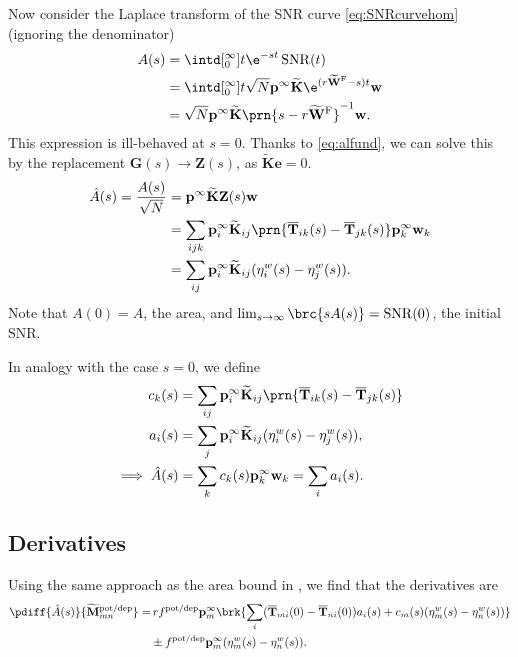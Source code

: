 \documentclass[12pt]{article}
\newcommand{\inv}{^{-1}}
\newcommand{\onev}{\mathbf{e}}
\newcommand{\pr}{\mathbf{p}}
\newcommand{\eq}{\pr^\infty}
\newcommand{\fpt}{\mathbf{T}}
\newcommand{\fptb}{\overline{\fpt}}
\newcommand{\fund}{\mathbf{Z}}
\newcommand{\w}{\mathbf{w}}
\newcommand{\W}{\mathbf{W}}
\newcommand{\M}{\mathbf{M}}
\newcommand{\enc}{\mathbf{K}}
\newcommand{\potdep}{^{\text{pot/dep}}}
\newcommand{\Mh}{\widetilde{\M}}
\newcommand{\frgh}{\widetilde{\W}^{\mathrm{F}}}
\newcommand{\ench}{\widetilde{\enc}}
\DeclareMathOperator{\SNR}{SNR}
\begin{document}
Now consider the Laplace transform of the SNR curve \eqref{eq:SNRcurvehom} (ignoring the denominator)
%
\begin{equation}\label{eq:lsnr}
\begin{aligned}
  A(s) &= \intd[_0^{\infty}]{t} \e^{-st}\SNR(t) \\
   &= \intd[_0^{\infty}]{t} \sqrt{N} \eq \ench \e^{(r\frgh-s)t} \w \\
   &= \sqrt{N} \eq \ench \prn{s - r\frgh}\inv \w.
\end{aligned}
\end{equation}
%
This expression is ill-behaved at $s=0$.
Thanks to \eqref{eq:alfund}, we can solve this by the replacement $\mathbf{G}(s) \to \fund(s)$, as $\ench\onev=0$.
%
\begin{equation}\label{eq:larea}
\begin{aligned}
  \hat{A}(s) = \frac{A(s)}{\sqrt{N}} &=  \eq \ench \fund(s) \w \\
    &= \sum_{ijk} \eq_i \ench_{ij} \prn{\fptb_{ik}(s)-\fptb_{jk}(s)} \eq_k \w_k \\
    &= \sum_{ij}  \eq_i \ench_{ij} (\eta^w_{i}(s) - \eta^w_{j}(s)).
\end{aligned}
\end{equation}
%
Note that $A(0)=A$, the area, and $\lim_{s\to\infty} \brc{sA(s)} = \SNR(0)$, the initial SNR.

In analogy with the case $s=0$, we define
%
\begin{equation}\label{eq:lareacoeffs}
  \begin{aligned}
    c_k(s) &= \sum_{ij} \eq_i \ench_{ij} \prn{\fptb_{ik}(s)-\fptb_{jk}(s)} \\
    a_i(s) &= \sum_j \eq_i \ench_{ij} (\eta^w_{i}(s) - \eta^w_{j}(s)),\\
    \implies
    \hat{A}(s) &= \sum_k c_k(s) \eq_k \w_k
      = \sum_i a_i(s).
  \end{aligned}
\end{equation}
%

\subsection{Derivatives}\label{sec:lderiv}

Using the same approach as the area bound in \cite{Lahiri2013synapse}, we find that the derivatives are
%
\begin{equation}\label{eq:lAdiff}
\begin{aligned}
  \pdiff{\hat{A}(s)}{\Mh\potdep_{mn}{}}
     =&\, rf\potdep \eq_m \brk{ \sum_i (\fptb_{mi}(0)-\fptb_{ni}(0)) a_i(s)
     +c_m(s) (\eta^w_m(s) - \eta^w_n(s)) } \\
     &\pm f\potdep \eq_m (\eta^w_m(s) - \eta^w_n(s)).
\end{aligned}
\end{equation}
%
\end{document}
